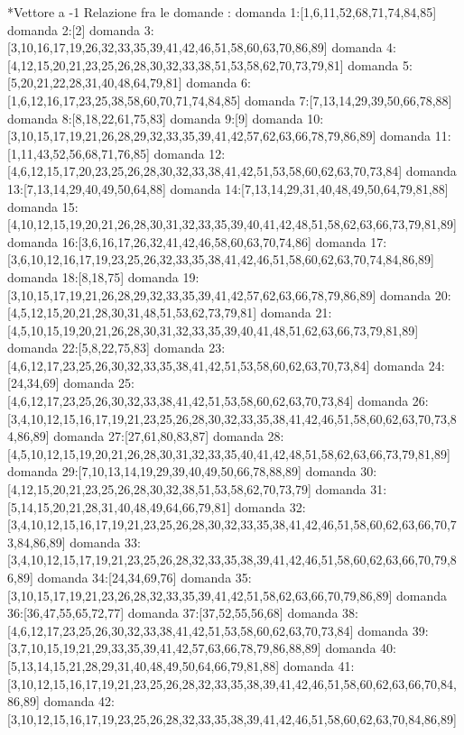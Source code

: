 *Vettore a -1
Relazione fra le domande :
domanda 1:[1,6,11,52,68,71,74,84,85]
domanda 2:[2]
domanda 3:[3,10,16,17,19,26,32,33,35,39,41,42,46,51,58,60,63,70,86,89]
domanda 4:[4,12,15,20,21,23,25,26,28,30,32,33,38,51,53,58,62,70,73,79,81]
domanda 5:[5,20,21,22,28,31,40,48,64,79,81]
domanda 6:[1,6,12,16,17,23,25,38,58,60,70,71,74,84,85]
domanda 7:[7,13,14,29,39,50,66,78,88]
domanda 8:[8,18,22,61,75,83]
domanda 9:[9]
domanda 10:[3,10,15,17,19,21,26,28,29,32,33,35,39,41,42,57,62,63,66,78,79,86,89]
domanda 11:[1,11,43,52,56,68,71,76,85]
domanda 12:[4,6,12,15,17,20,23,25,26,28,30,32,33,38,41,42,51,53,58,60,62,63,70,73,84]
domanda 13:[7,13,14,29,40,49,50,64,88]
domanda 14:[7,13,14,29,31,40,48,49,50,64,79,81,88]
domanda 15:[4,10,12,15,19,20,21,26,28,30,31,32,33,35,39,40,41,42,48,51,58,62,63,66,73,79,81,89]
domanda 16:[3,6,16,17,26,32,41,42,46,58,60,63,70,74,86]
domanda 17:[3,6,10,12,16,17,19,23,25,26,32,33,35,38,41,42,46,51,58,60,62,63,70,74,84,86,89]
domanda 18:[8,18,75]
domanda 19:[3,10,15,17,19,21,26,28,29,32,33,35,39,41,42,57,62,63,66,78,79,86,89]
domanda 20:[4,5,12,15,20,21,28,30,31,48,51,53,62,73,79,81]
domanda 21:[4,5,10,15,19,20,21,26,28,30,31,32,33,35,39,40,41,48,51,62,63,66,73,79,81,89]
domanda 22:[5,8,22,75,83]
domanda 23:[4,6,12,17,23,25,26,30,32,33,35,38,41,42,51,53,58,60,62,63,70,73,84]
domanda 24:[24,34,69]
domanda 25:[4,6,12,17,23,25,26,30,32,33,38,41,42,51,53,58,60,62,63,70,73,84]
domanda 26:[3,4,10,12,15,16,17,19,21,23,25,26,28,30,32,33,35,38,41,42,46,51,58,60,62,63,70,73,84,86,89]
domanda 27:[27,61,80,83,87]
domanda 28:[4,5,10,12,15,19,20,21,26,28,30,31,32,33,35,40,41,42,48,51,58,62,63,66,73,79,81,89]
domanda 29:[7,10,13,14,19,29,39,40,49,50,66,78,88,89]
domanda 30:[4,12,15,20,21,23,25,26,28,30,32,38,51,53,58,62,70,73,79]
domanda 31:[5,14,15,20,21,28,31,40,48,49,64,66,79,81]
domanda 32:[3,4,10,12,15,16,17,19,21,23,25,26,28,30,32,33,35,38,41,42,46,51,58,60,62,63,66,70,73,84,86,89]
domanda 33:[3,4,10,12,15,17,19,21,23,25,26,28,32,33,35,38,39,41,42,46,51,58,60,62,63,66,70,79,86,89]
domanda 34:[24,34,69,76]
domanda 35:[3,10,15,17,19,21,23,26,28,32,33,35,39,41,42,51,58,62,63,66,70,79,86,89]
domanda 36:[36,47,55,65,72,77]
domanda 37:[37,52,55,56,68]
domanda 38:[4,6,12,17,23,25,26,30,32,33,38,41,42,51,53,58,60,62,63,70,73,84]
domanda 39:[3,7,10,15,19,21,29,33,35,39,41,42,57,63,66,78,79,86,88,89]
domanda 40:[5,13,14,15,21,28,29,31,40,48,49,50,64,66,79,81,88]
domanda 41:[3,10,12,15,16,17,19,21,23,25,26,28,32,33,35,38,39,41,42,46,51,58,60,62,63,66,70,84,86,89]
domanda 42:[3,10,12,15,16,17,19,23,25,26,28,32,33,35,38,39,41,42,46,51,58,60,62,63,70,84,86,89]
